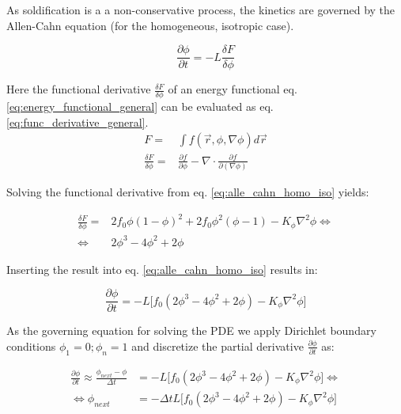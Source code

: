 As soldification is a a non-conservative process, the kinetics are governed by the Allen-Cahn equation (for the  homogeneous, isotropic case).

\begin{equation}
	\frac{\partial \phi}{\partial t} =-L \frac{\delta F}{\delta \phi} \label{eq:alle_cahn_homo_iso}
\end{equation}

Here the functional derivative \(\frac{\delta F}{\delta \phi}\) of an energy functional eq. \ref{eq:energy_functional_general} can be evaluated as eq. \ref{eq:func_derivative_general}.\\


\begin{subequations}
	\begin{align}
		F =& \int f(\vec{r}, \phi, \nabla \phi) d\vec{r} \label{eq:energy_functional_general} \\
		\frac{\delta F}{\delta \phi} =& \frac{\partial f}{ \partial \phi} - \nabla \cdot \frac{\partial f}{\partial (\nabla \phi)} \label{eq:func_derivative_general}
		\end{align}
\end{subequations}

Solving the functional derivative from eq. \ref{eq:alle_cahn_homo_iso} yields:

\begin{subequations}
	\begin{align}
		\frac{\delta F}{\delta \phi} =& 2 f_{0}\phi (1-\phi)^2 + 2 f_{0}\phi^{2} (\phi -1) - K_{\phi} \nabla^{2} \phi \Leftrightarrow \\
		\Leftrightarrow  & 2\phi^{3}  -4\phi^{2} + 2\phi
	\end{align}
\end{subequations}

Inserting the result into eq. \ref{eq:alle_cahn_homo_iso} results in:

\begin{equation}
	\frac{\partial \phi}{\partial t} = -L \bigl[  f_0 ( 2\phi^{3} -4\phi^{2} + 2\phi) - K_{\phi} \nabla^{2} \phi \bigr]
\end{equation}

As the governing equation for solving the PDE we apply Dirichlet boundary conditions \(\phi_{1} = 0; \phi_{n}=1\) and discretize the partial derivative \(\frac{\partial \phi}{\partial t}\) as:

\begin{subequations}
	\begin{align}
	\frac{\partial \phi}{\partial t}  \approx \frac{\phi_{next} - \phi}{\Delta t} &=  -L \bigl[  f_0 ( 2\phi^{3} -4\phi^{2} + 2\phi) - K_{\phi} \nabla^{2} \phi \bigr] \Leftrightarrow \\
	\Leftrightarrow \phi_{next} & = -\Delta t L \bigl[  f_0 ( 2\phi^{3} -4\phi^{2} + 2\phi) - K_{\phi} \nabla^{2} \phi \bigr]
    \end{align}
\end{subequations}

